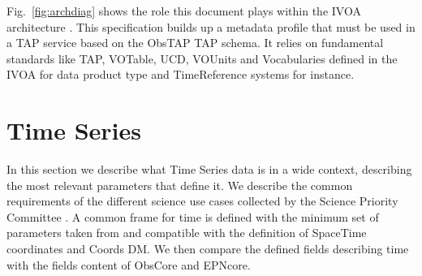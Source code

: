 \documentclass[11pt,a4paper]{ivoa}
\begin{document}
Fig.~\ref{fig:archdiag} shows the role this document plays within the
IVOA architecture \citep{2021ivoa.spec.1101D}. This specification builds up a metadata profile that must be used in a TAP service based on the ObsTAP TAP schema.
It relies on fundamental  standards like TAP, VOTable, UCD, VOUnits and Vocabularies defined in the IVOA  for data product type and TimeReference systems
for instance.


\section{Time Series}
\label{sect:metadata}

In this section we describe what Time Series data is in a wide context, describing the most relevant parameters that define it. We describe the common requirements of the different science use cases collected by the Science Priority Committee \cite{SPC_UC}. A common frame for time is defined with the minimum set of parameters taken from and compatible with the definition of SpaceTime coordinates and Coords DM. We then compare the defined fields describing time with the fields content of ObsCore and EPNcore.
\end{document}
